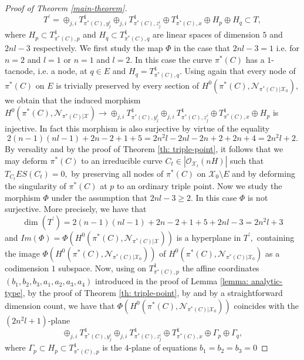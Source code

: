 \documentclass[plain]{amsart}
\def\N{\mathcal N}
\begin{document}
\begin{proof}[Proof of Theorem \ref{main-theorem}]
$$T^\prime=\oplus_{j,i}T^1_{\pi^*(C),y_j^i}\oplus_{j,i}T^1_{\pi^*(C),z_j^i}\oplus T^1_{\pi^*(C),x}
\oplus H_p\oplus H_q\subset T,$$ 
where $H_p\subset T^1_{\pi^*(C),p}$ and $H_q\subset T^1_{\pi^*(C),q}$ are linear spaces of dimension $5$
and $2nl-3$ respectively. We first study the map $\Phi$ in the case that $2nl-3=1$ i.e. for $n=2$ and $l=1$ or $n=1$ and $l=2.$
In this case the curve
$\pi^*(C)$ has a $1$-tacnode, i.e. a node, at $q\in E$ and $H_q=T^1_{\pi^*(C),q}.$
Using again that every node of $\pi^*(C)$ on $E$
is trivially preserved by every section of $H^0(\pi^*(C),\N_{\pi^*(C)|\mathcal X_0}),$ we obtain that the induced
morphism
$H^0(\pi^*(C),\N_{\pi^*(C)|\mathcal X})\to \oplus_{j,i}T^1_{\pi^*(C),y_j^i}\oplus_{j,i}T^1_{\pi^*(C),z_j^i} \oplus T^1_{\pi^*(C),x}
\oplus H_p$
is injective. In fact this morphism is also
 surjective by virtue of the equality $$2(n-1)(nl-1)+2n-2+1+5=2n^2l-2nl-2n+2+2n+4=2n^2l+2.$$ 
By versality and by the proof of Theorem \ref{th: triple-point}, it follows that 
we may deform $\pi^*(C)$ to an irreducible curve $C_t\in |\mathcal O_{\mathcal X_t}(nH)|$
such that $T_{C_t}ES(C_t)=0,$ by preserving all
nodes of $\pi^*(C)$ on $\mathcal X_0 \setminus E$ and by deforming the singularity of $\pi^*(C)$ at $p$ to an ordinary
triple point. 
Now we study the morphism $\Phi$ under the assumption that $2nl-3\geq 2.$ In this case
$\Phi$ is not surjective. More precisely, 
we have that
$$
\dim(T^\prime)=2(n-1)(nl-1)+2n-2+1+5+2nl-3=2n^2l+3$$
and $Im(\Phi)=\Phi(H^0(\pi^*(C),\N_{\pi^*(C)|\mathcal X}))$ 
 is a hyperplane in $T^\prime,$ containing  the image $\Phi(H^0(\pi^*(C),\N_{\pi^*(C)|\mathcal X_0}))$
of $H^0(\pi^*(C),\N_{\pi^*(C)|\mathcal X_0})$ as a codimension $1$ subspace. 
Now, using on $T^1_{\pi^*(C),p}$ the affine coordinates $(b_1,b_2,b_3,a_1,a_2,a_3,a_4)$
introduced in the proof
of Lemma \ref{lemma: analytic-type}, by the proof of Theorem \ref{th: triple-point}, by \cite[Proof of Theorem 3.3]{galati-knutsen}
and by a straightforward dimension count, we have that $\Phi(H^0(\pi^*(C),\N_{\pi^*(C)|\mathcal X_0}))$
coincides with the $(2n^2l+1)$-plane
$$ 
\oplus_{j,i}T^1_{\pi^*(C),y_j^i}\oplus_{j,i}T^1_{\pi^*(C),z_j^i}\oplus T^1_{\pi^*(C),x}
\oplus \Gamma_p\oplus \Gamma_q,
$$
where $\Gamma_p\subset H_p\subset T^1_{\pi^*(C),p}$ is the $4$-plane of equations $b_1=b_2=b_3=0$

\end{proof}
\end{document}
